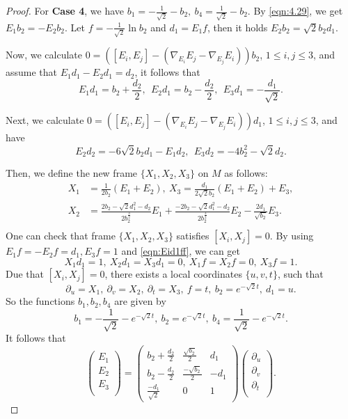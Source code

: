 \documentclass[reqno]{amsart}%
\theoremstyle{definition}
\numberwithin{equation}{section}
\begin{document}
\begin{proof}
For {\bf Case 4}, we have $b_1=-\frac{1}{\sqrt{2}}-b_2,\ b_4=\frac{1}{\sqrt{2}}-b_2$. By \eqref{eqn:4.29}, we get $E_1b_2=-E_2b_2$. Let $f=-\frac{1}{\sqrt{2}}\ln b_2$ and $d_1=E_1f$,
then it holds $E_2b_2=\sqrt{2}b_2d_1$.

Now, we calculate $0=([E_i,E_j]-(\nabla_{E_i}{E_j}-\nabla_{E_j}{E_i}))b_2$, $1\leq i,j\leq3$, and assume that
$E_1d_1-E_2d_1=d_2$, it follows that
\begin{equation}\label{eqn:Eid1ff}
E_1d_1=b_2+\frac{d_2}{2},\ \ E_2d_1=b_2-\frac{d_2}{2},\ \ E_3d_1=-\frac{d_1}{\sqrt{2}}.
\end{equation}

Next, we calculate $0=([E_i,E_j]-(\nabla_{E_i}{E_j}-\nabla_{E_j}{E_i}))d_1$, $1\leq i,j\leq3$, and have
\begin{equation}\label{eqn:Eid2ff}
E_2d_2=-6\sqrt{2}b_2d_1-E_1d_2,\ \ E_3d_2=-4b_2^2-\sqrt{2}d_2.
\end{equation}

Then, we define the new frame $\{X_1,X_2,X_3\}$ on $M$ as follows:
$$
\begin{aligned}
X_1&=\frac{1}{2b_2}(E_1+E_2),\ X_3=\frac{d_1}{2\sqrt{2}b_2}(E_1+E_2)+E_3,\\
X_2&=\frac{2b_2-\sqrt{2}d_1^2-d_2}{2b_2^{\frac{3}{2}}}E_1+\frac{-2b_2-\sqrt{2}d_1^2-d_2}{2b_2^{\frac{3}{2}}}E_2
-\frac{2d_1}{\sqrt{b_2}}E_3.\\
\end{aligned}
$$
One can check that frame $\{X_1,X_2,X_3\}$ satisfies $[X_i,X_j]=0$. By using $E_1f=-E_2f=d_1,E_3f=1$ and
\eqref{eqn:Eid1ff}, we can get
$$
X_1d_1=1,\ X_2d_1=X_3d_1=0,\ X_1f=X_2f=0,\ X_3f=1.
$$
Due that $[X_i,X_j]=0$, there exists a local coordinates $\{u,v,t\}$, such that
$$
\partial_u=X_1,\ \partial_v=X_2,\ \partial_t=X_3,\ f=t,\ b_2=e^{-\sqrt{2}t},\ d_1=u.
$$
So the functions $b_1,b_2,b_4$ are given by
%
\begin{equation}\label{eqn:3.1ffff1}
b_1=-\frac{1}{\sqrt{2}}-e^{-\sqrt{2}t},\ b_2=e^{-\sqrt{2}t},\ b_4=\frac{1}{\sqrt{2}}-e^{-\sqrt{2}t}.
\end{equation}
It follows that
\begin{equation}\label{eqn:d1d2ff}
\left(
  \begin{array}{c}
    E_1 \\
    E_2 \\
    E_3 \\
  \end{array}
\right)
=\left(\begin{array}{cccc}
b_2+\frac{d_2}{2} & \frac{\sqrt{b_2}}{2} & d_1 \\
b_2-\frac{d_2}{2} & \frac{-\sqrt{b_2}}{2} & -d_1 \\
\frac{-d_1}{\sqrt{2}} & 0 & 1
\end{array}\right)
\left(
  \begin{array}{c}
    \partial_u \\
    \partial_v \\
    \partial_t \\
  \end{array}
\right).
\end{equation}


\end{proof}
\end{document}

